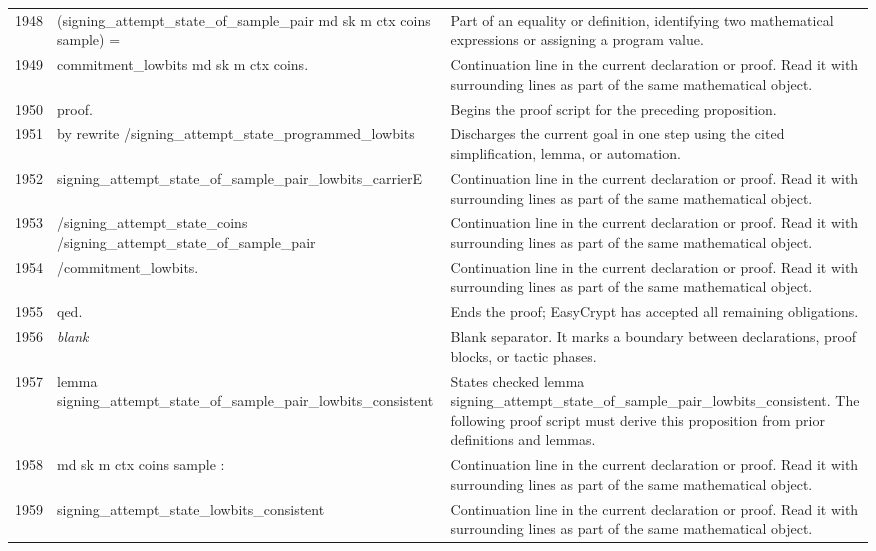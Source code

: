 \documentclass[10pt]{article}
\begin{document}
\begin{longtable}{r L{0.53\textwidth} L{0.37\textwidth}}
1948 & {\ttfamily\scriptsize     (signing\_attempt\_state\_of\_sample\_pair md sk m ctx coins sample) =} & Part of an equality or definition, identifying two mathematical expressions or assigning a program value. \\
1949 & {\ttfamily\scriptsize   commitment\_lowbits md sk m ctx coins.} & Continuation line in the current declaration or proof.  Read it with surrounding lines as part of the same mathematical object. \\
1950 & {\ttfamily\scriptsize proof.} & Begins the proof script for the preceding proposition. \\
1951 & {\ttfamily\scriptsize by rewrite /signing\_attempt\_state\_programmed\_lowbits} & Discharges the current goal in one step using the cited simplification, lemma, or automation. \\
1952 & {\ttfamily\scriptsize            signing\_attempt\_state\_of\_sample\_pair\_lowbits\_carrierE} & Continuation line in the current declaration or proof.  Read it with surrounding lines as part of the same mathematical object. \\
1953 & {\ttfamily\scriptsize            /signing\_attempt\_state\_coins /signing\_attempt\_state\_of\_sample\_pair} & Continuation line in the current declaration or proof.  Read it with surrounding lines as part of the same mathematical object. \\
1954 & {\ttfamily\scriptsize            /commitment\_lowbits.} & Continuation line in the current declaration or proof.  Read it with surrounding lines as part of the same mathematical object. \\
1955 & {\ttfamily\scriptsize qed.} & Ends the proof; EasyCrypt has accepted all remaining obligations. \\
1956 & {\ttfamily\scriptsize \emph{blank}} & Blank separator.  It marks a boundary between declarations, proof blocks, or tactic phases. \\
1957 & {\ttfamily\scriptsize lemma signing\_attempt\_state\_of\_sample\_pair\_lowbits\_consistent} & States checked lemma signing\_attempt\_state\_of\_sample\_pair\_lowbits\_consistent.  The following proof script must derive this proposition from prior definitions and lemmas. \\
1958 & {\ttfamily\scriptsize    md sk m ctx coins sample :} & Continuation line in the current declaration or proof.  Read it with surrounding lines as part of the same mathematical object. \\
1959 & {\ttfamily\scriptsize   signing\_attempt\_state\_lowbits\_consistent} & Continuation line in the current declaration or proof.  Read it with surrounding lines as part of the same mathematical object. \\

\end{longtable}
\end{document}
